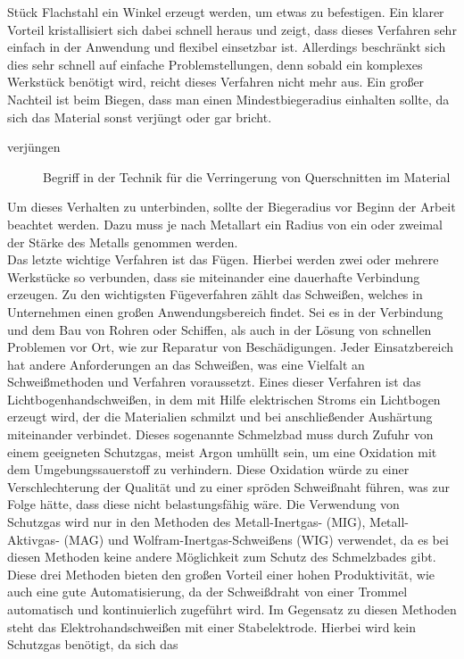 Stück Flachstahl ein Winkel erzeugt werden, um etwas zu befestigen. Ein klarer Vorteil kristallisiert sich dabei schnell heraus und zeigt, dass dieses 
Verfahren sehr einfach in der Anwendung und flexibel einsetzbar ist. Allerdings beschränkt sich dies sehr schnell auf einfache Problemstellungen, denn 
sobald ein komplexes Werkstück benötigt wird, reicht dieses Verfahren nicht mehr aus. Ein großer Nachteil ist beim Biegen, dass man einen Mindestbiegeradius 
einhalten sollte, da sich das Material sonst verjüngt oder gar bricht.
\begin{description}
\item[verjüngen] Begriff in der Technik für die Verringerung von Querschnitten im Material
\end{description}
Um dieses Verhalten zu unterbinden, sollte der Biegeradius vor Beginn der Arbeit beachtet werden. Dazu muss je nach Metallart ein Radius von ein oder zweimal 
der Stärke des Metalls genommen werden.\\
Das letzte wichtige Verfahren ist das Fügen. Hierbei werden zwei oder mehrere Werkstücke so verbunden, dass sie miteinander eine dauerhafte Verbindung 
erzeugen. Zu den wichtigsten Fügeverfahren zählt das Schweißen, welches in Unternehmen einen großen Anwendungsbereich findet. Sei es in der Verbindung 
und dem Bau von Rohren oder Schiffen, als auch in der Lösung von schnellen Problemen vor Ort, wie \zB zur Reparatur von Beschädigungen. Jeder Einsatzbereich 
hat andere Anforderungen an das Schweißen, was eine Vielfalt an Schweißmethoden und Verfahren voraussetzt. Eines dieser Verfahren ist das 
Lichtbogenhandschweißen, in dem mit Hilfe elektrischen Stroms ein Lichtbogen erzeugt wird, der die Materialien schmilzt und bei anschließender 
Aushärtung miteinander verbindet. Dieses sogenannte Schmelzbad muss durch Zufuhr von einem geeigneten Schutzgas, meist Argon umhüllt sein, um eine Oxidation 
mit dem Umgebungssauerstoff zu verhindern. Diese Oxidation würde zu einer Verschlechterung der Qualität und zu einer spröden Schweißnaht führen, was zur 
Folge hätte, dass diese nicht belastungsfähig wäre. Die Verwendung von Schutzgas wird nur in den Methoden des Metall-Inertgas- (MIG), Metall-Aktivgas- (MAG) 
und Wolfram-Inertgas-Schweißens (WIG) verwendet, da es bei diesen Methoden keine andere Möglichkeit zum Schutz des Schmelzbades gibt. Diese drei Methoden 
bieten den großen Vorteil einer hohen Produktivität, wie auch eine gute Automatisierung, da der Schweißdraht von einer Trommel automatisch und kontinuierlich 
zugeführt wird. Im Gegensatz zu diesen Methoden steht das Elektrohandschweißen mit einer Stabelektrode. Hierbei wird kein Schutzgas benötigt, da sich das 
